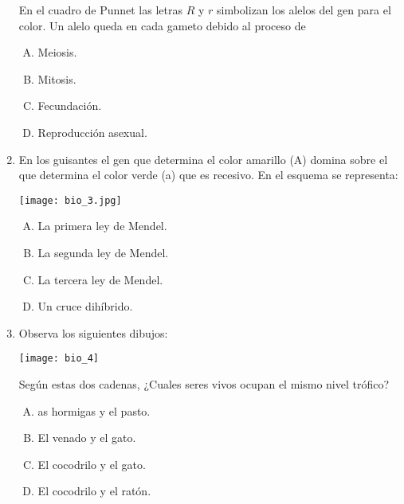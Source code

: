 \begin{enumerate}
En el cuadro de Punnet las letras $R$ y $r$ simbolizan los alelos del gen para el color. Un alelo queda en cada gameto debido al proceso de 
\begin{enumerate}[(A)]
\item Meiosis.
\item Mitosis.
\item Fecundación.
\item Reproducción asexual.
\end{enumerate}


\item En los guisantes el gen que determina el color amarillo (A) domina sobre el que determina el color verde (a) que es recesivo. En el esquema  se representa: \label{bio-4}


\begin{flushleft}
\texttt{[image: bio\_3.jpg]} 
\end{flushleft}

\begin{enumerate}[(A)]
\item La primera ley de Mendel.
\item La segunda ley de Mendel.
\item La tercera ley de Mendel.
\item Un cruce dihíbrido.
\end{enumerate}

\item Observa los siguientes dibujos: \label{bio-5}

\begin{flushleft}
\texttt{[image: bio\_4]} 
\end{flushleft}

Según estas dos cadenas, ¿Cuales seres vivos ocupan el mismo nivel trófico?

\begin{enumerate}[(A)]
\item  as hormigas y el pasto.
\item El venado y el gato.
\item El cocodrilo y el gato.
\item El cocodrilo y el ratón.
\end{enumerate}




\end{enumerate}
